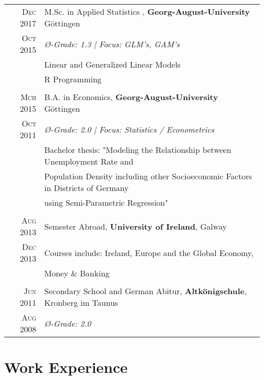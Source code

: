\documentclass[a4paper,10pt]{article} %
\begin{document}
\begin{tabular}{rl}
\textsc{Dec 2017}& M.Sc. in Applied Statistics , \textbf{Georg-August-University} Göttingen\\
\textsc{Oct 2015}& \emph{{{\O}}-Grade: 1.3 | Focus: GLM's, GAM's}\\
& \footnotesize{Linear and Generalized Linear Models} \\
& \footnotesize{R Programming} \\
&\\




\textsc{Mch 2015}& B.A. in Economics, \textbf{Georg-August-University} Göttingen\\
\textsc{Oct 2011}& \emph{{{\O}}-Grade: 2.0 | Focus: Statistics / Econometrics}\\
&\footnotesize{Bachelor thesis: "Modeling the Relationship between
Unemployment Rate and}\\
&\footnotesize{Population Density including other
Socioeconomic Factors in Districts of
Germany}\\
& \footnotesize{using Semi-Parametric Regression"} \\
&\\


\textsc{Aug 2013} & Semester Abroad, \textbf{University of Ireland}, Galway\\
\textsc{Dec 2013} & \footnotesize{Courses include: Ireland, Europe and the Global Economy,}\\
& \footnotesize{Money \& Banking} \\
&\\

\textsc{Jun 2011} & Secondary School and German Abitur, \textbf{Altkönigschule}, Kronberg im Taunus\\
\textsc{Aug 2008}& \emph{{\O}-Grade: 2.0}\\

\end{tabular}


\section{Work Experience}
\end{document}
